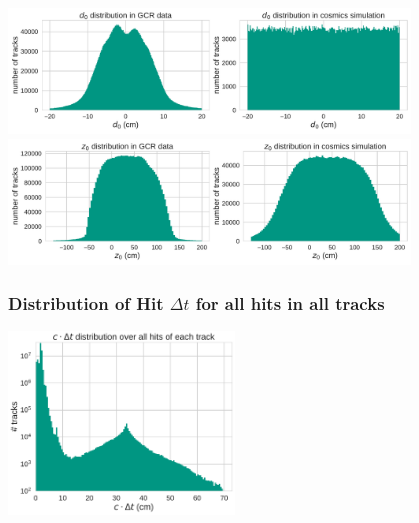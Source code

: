 \documentclass[18pt]{beamer}
\begin{document}
\begin{frame}
  \begin{center}
    \includegraphics[width=0.8\textwidth]{figures/distributions/gcr_d0_distribution_uncut.pdf}\\
    \includegraphics[width=0.8\textwidth]{figures/distributions/gcr_z0_distribution_uncut.pdf}
  \end{center}
\end{frame}

\begin{frame}
  \frametitle{Distribution of Hit $\Delta t$ for all hits in all tracks}  
  \begin{center}
    \includegraphics[width=0.45\textwidth]{figures/delta_t/gcraugust_delta_t_log.pdf}
  \end{center}
\end{frame}
\end{document}
